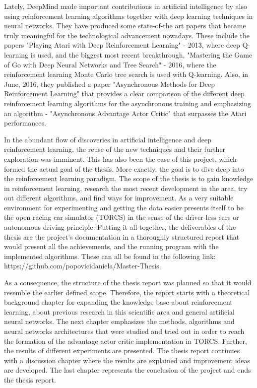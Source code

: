 Lately, DeepMind made important contributions in artificial intelligence by also using reinforcement learning algorithms together with deep learning techniques in neural networks. They have produced some state-of-the art papers that became truly meaningful for the technological advancement nowadays. These include the papers "Playing Atari with Deep Reinforcement Learning" \cite{DBLP:journals/corr/MnihKSGAWR13} - 2013, where deep Q-learning is used, and the biggest most recent breakthrough, "Mastering the Game of Go with Deep Neural Networks and Tree Search" \cite{Silver_2016} - 2016, where the reinforcement learning Monte Carlo tree search is used with Q-learning. Also, in June, 2016, they published a paper "Asynchronous Methods for Deep Reinforcement Learning" \cite{DBLP:journals/corr/MnihBMGLHSK16} that provides a clear comparison of the different deep reinforcement learning algorithms for the asynchronous training and emphasizing an algorithm - "Asynchronous Advantage Actor Critic" that surpasses the Atari performances.

In the abundant flow of discoveries in artificial intelligence and deep reinforcement learning, the reuse of the new techniques and their further exploration was imminent. This has also been the case of this project, which formed the actual goal of the thesis. More exactly, the goal is to dive deep into the reinforcement learning paradigm. The scope of the thesis is to gain knowledge in reinforcement learning, research the most recent development in the area, try out different algorithms, and find ways for improvement. As a very suitable environment for experimenting and getting the data easier presents itself to be the open racing car simulator (TORCS) in the sense of the driver-less cars or autonomous driving principle. Putting it all together, the deliverables of the thesis are the project's documentation in a thoroughly structured report that would present all the achievements, and the running program with the implemented algorithms. These can all be found in the following link: https://github.com/popovicidaniela/Master-Thesis.

As a consequence, the structure of the thesis report was planned so that it would resemble the earlier defined scope. Therefore, the report starts with a theoretical background chapter for expanding the knowledge base about reinforcement learning, about previous research in this scientific area and general artificial neural networks. The next chapter emphasizes the methods, algorithms and neural networks architectures that were studied and tried out in order to reach the formation of the advantage actor critic implementation in TORCS. Further, the results of different experiments are presented. The thesis report continues with a discussion chapter where the results are explained and improvement ideas are developed. The last chapter represents the conclusion of the project and ends the thesis report.